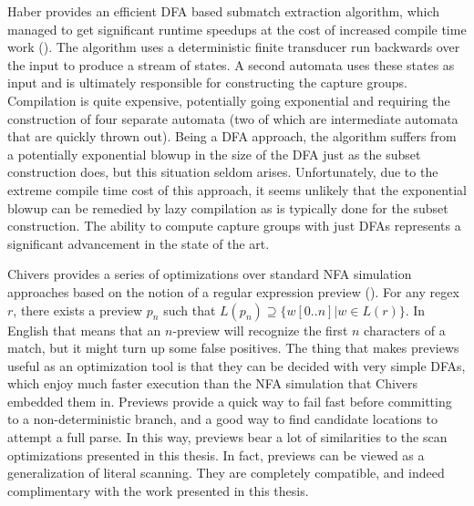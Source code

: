 Haber provides an efficient DFA based submatch extraction algorithm,
which managed to get significant runtime speedups at the cost of
increased compile time work (\cite{Haber2013}). The algorithm uses
a deterministic finite transducer run backwards over the input
to produce a stream of states. A second automata uses these
states as input and is ultimately responsible for constructing
the capture groups. Compilation is quite expensive, potentially
going exponential and requiring the construction of four separate
automata (two of which are intermediate automata that are quickly
thrown out). Being a DFA approach, the algorithm suffers from
a potentially exponential blowup in the size of the DFA just as
the subset construction does, but this situation seldom arises.
Unfortunately, due to the extreme compile time cost of this
approach, it seems unlikely that the exponential blowup can be
remedied by lazy compilation as is typically done for the subset
construction. The ability to compute capture groups with
just DFAs represents a significant advancement in the state of the art.

Chivers provides a series of optimizations over standard NFA simulation
approaches based on the notion of a regular expression preview
(\cite{Chivers2016}). For any regex $r$, there exists a preview $p_n$
such that $L(p_n) \supseteq \{ w[0..n] | w \in L(r) \}$. In English
that means that an $n$-preview will recognize the first $n$ characters
of a match, but it might turn up some false positives. The thing that
makes previews useful as an optimization tool is that they can be
decided with very simple DFAs, which enjoy much faster execution than
the NFA simulation that Chivers embedded them in. Previews provide
a quick way to fail fast before committing to a non-deterministic
branch, and a good way to find candidate locations to attempt a
full parse. In this way, previews bear a lot of similarities to the
scan optimizations presented in this thesis. In fact, previews can be
viewed as a generalization of literal scanning. They are completely
compatible, and indeed complimentary with the work presented in this
thesis.



